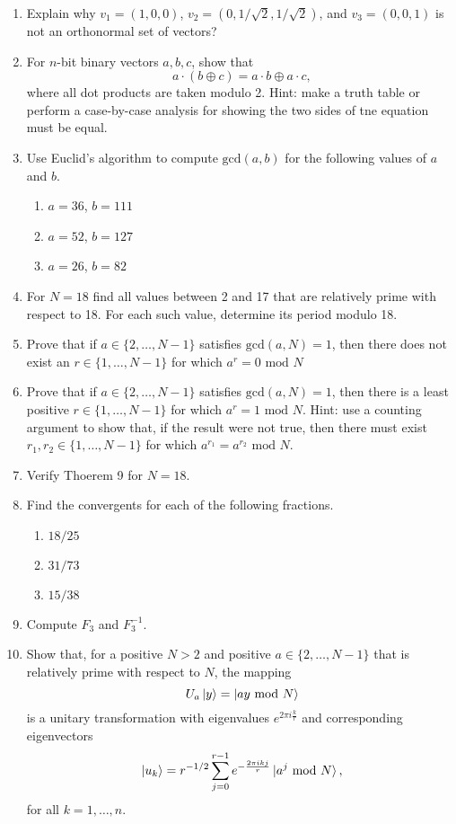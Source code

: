 \documentclass [12pt]{article}
\theoremstyle{definition}
\begin{document}
\begin{enumerate}
\item Explain why $v_{1}=(1,0,0)$, $v_{2}=(0,1/\sqrt{2},1/\sqrt{2})$, and $v_{3}=(0,0,1)$ is not an orthonormal set of vectors?
 
\item For $n$-bit binary vectors $a,b,c$, show that 
\[a\cdot (b\oplus c)= a\cdot b \oplus a\cdot c,\]
where all dot products are taken modulo 2. Hint: make a truth table or perform a case-by-case analysis for showing the two sides of tne equation must be equal.

\item Use Euclid's algorithm to compute $\mbox{gcd}(a,b)$ for the following values of $a$ and $b$.
\begin{enumerate}
\item $a=36$, $b=111$
\item $a=52$, $b=127$
\item $a=26$, $b=82$
\end{enumerate}

\item For $N=18$ find all values between 2 and 17 that are relatively prime with respect to 18. For each such value, determine its period modulo 18.

\item Prove that if $a\in\{2,\ldots,N-1\}$ satisfies $\mbox{gcd}(a,N)=1$, then there does not exist an $r\in\{1,\ldots,N-1\}$ for which $a^r=0\mbox{ mod }N$

\item Prove that if $a\in\{2,\ldots,N-1\}$ satisfies $\mbox{gcd}(a,N)=1$, then there is a least positive $r\in\{1,\ldots,N-1\}$ for which $a^r=1\mbox{ mod }N$.
Hint: use a counting argument to show that, if the result were not true, then there must exist $r_1,r_2\in\{1,\ldots,N-1\}$ for which
$a^{r_1}=a^{r_2}\mbox{ mod }N$.

\item Verify Thoerem 9 for $N=18$.

\item Find the convergents for each of the following fractions.
\begin{enumerate}
\item $18/25$
\item $31/73$
\item $15/38$
\end{enumerate}

\item Compute $F_3$ and $F_3^{-1}$.

\item Show that, for a positive $N > 2$ and positive $a\in\{2,\ldots,N-1\}$ that is relatively prime with respect to $N$, the mapping
 \[U_a\ket{y} = \ket{ay\mbox{ mod } N}\]
 is a unitary transformation with eigenvalues  $e^{2\pi i\frac{k}{r}}$ 
 and corresponding eigenvectors
 \[\ket{u_k} = r^{-1/2}\sum_{j=0}^{r-1}e^{-\frac{2\pi ikj}{r}}\ket{a^j\mbox{ mod } N},\]
 for all $k=1,\ldots,n$.
 

\end{enumerate}
\end{document}
